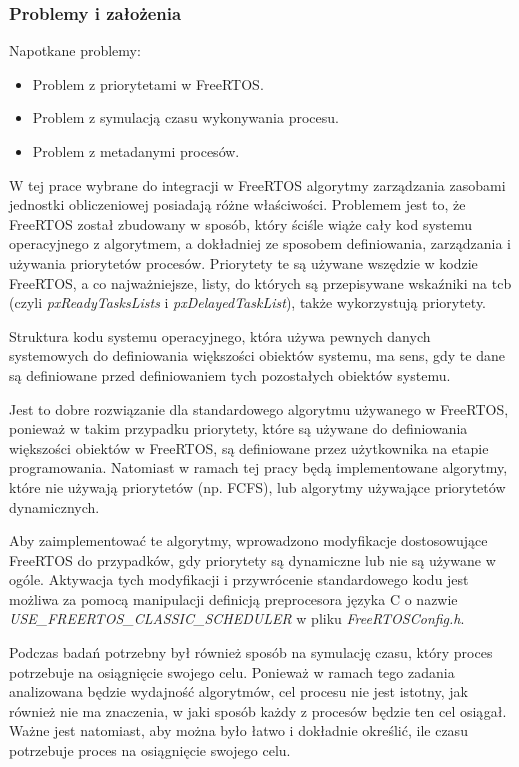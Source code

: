 \documentclass[../../main]{subfiles}
\begin{document}
\subsubsection{Problemy i założenia}

Napotkane problemy:

\begin{itemize}
    \item Problem z priorytetami w FreeRTOS.
    \item Problem z symulacją czasu wykonywania procesu.
    \item Problem z metadanymi procesów.
\end{itemize}

W tej prace wybrane do integracji w FreeRTOS algorytmy zarządzania zasobami jednostki obliczeniowej posiadają różne właściwości. Problemem jest to, że FreeRTOS został zbudowany w sposób, który ściśle wiąże cały kod systemu operacyjnego z algorytmem, a dokładniej ze sposobem definiowania, zarządzania i używania priorytetów procesów. Priorytety te są używane wszędzie w kodzie FreeRTOS, a co najważniejsze, listy, do których są przepisywane wskaźniki na \gls{tcb} (czyli \textit{pxReadyTasksLists} i \textit{pxDelayedTaskList}), także wykorzystują priorytety.

Struktura kodu systemu operacyjnego, która używa pewnych danych systemowych do definiowania większości obiektów systemu, ma sens, gdy te dane są definiowane przed definiowaniem tych pozostałych obiektów systemu.

Jest to dobre rozwiązanie dla standardowego algorytmu używanego w FreeRTOS, ponieważ w takim przypadku priorytety, które są używane do definiowania większości obiektów w FreeRTOS, są definiowane przez użytkownika na etapie programowania. Natomiast w ramach tej pracy będą implementowane algorytmy, które nie używają priorytetów (np. FCFS), lub algorytmy używające priorytetów dynamicznych.

Aby zaimplementować te algorytmy, wprowadzono modyfikacje dostosowujące FreeRTOS do przypadków, gdy priorytety są dynamiczne lub nie są używane w ogóle. Aktywacja tych modyfikacji i przywrócenie standardowego kodu jest możliwa za pomocą manipulacji definicją preprocesora języka C o nazwie \textit{USE\_FREERTOS\_CLASSIC\_SCHEDULER} w pliku \textit{FreeRTOSConfig.h}.

Podczas badań potrzebny był również sposób na symulację czasu, który proces potrzebuje na osiągnięcie swojego celu. Ponieważ w ramach tego zadania analizowana będzie wydajność algorytmów, cel procesu nie jest istotny, jak również nie ma znaczenia, w jaki sposób każdy z procesów będzie ten cel osiągał. Ważne jest natomiast, aby można było łatwo i dokładnie określić, ile czasu potrzebuje proces na osiągnięcie swojego celu.
\end{document}
